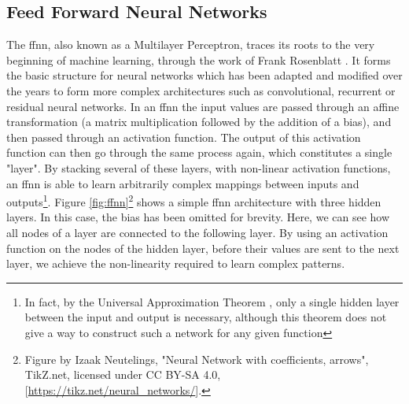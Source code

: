 \documentclass[UKenglish]{uiomasterthesis} %
\theoremstyle{definition}
\begin{document}
\subsection{Feed Forward Neural Networks}

The \ac{ffnn}, also known as a Multilayer Perceptron, traces its roots to the very beginning of machine learning, through the work of Frank Rosenblatt \cite{rosenblatt}. It forms the basic structure for neural networks which has been adapted and modified over the years to form more complex architectures such as convolutional, recurrent or residual neural networks. In an \ac{ffnn} the input values are passed through an affine transformation (a matrix multiplication followed by the addition of a bias), and then passed through an activation function. The output of this activation function can then go through the same process again, which constitutes a single "layer". By stacking several of these layers, with non-linear activation functions, an \ac{ffnn} is able to learn arbitrarily complex mappings between inputs and outputs\footnote{In fact, by the Universal Approximation Theorem \cite{uat}, only a single hidden layer between the input and output is necessary, although this theorem does not give a way to construct such a network for any given function}. Figure \ref{fig:ffnn}\footnote{Figure by Izaak Neutelings, "Neural Network with coefficients, arrows", TikZ.net, licensed under CC BY-SA 4.0, [\url{https://tikz.net/neural\_networks/}].} shows a simple \ac{ffnn} architecture with three hidden layers. In this case, the bias has been omitted for brevity. Here, we can see how all nodes of a layer are connected to the following layer. By using an activation function on the nodes of the hidden layer, before their values are sent to the next layer, we achieve the non-linearity required to learn complex patterns.
\end{document}
